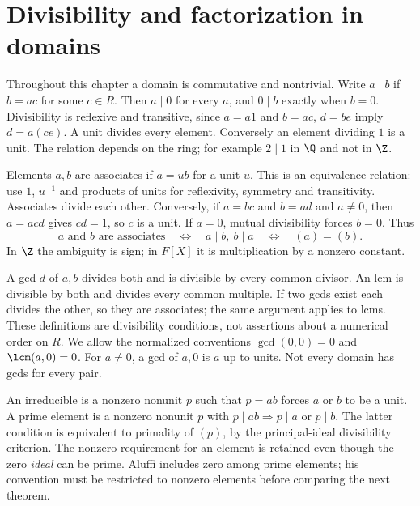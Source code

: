 \chapter{Divisibility and factorization in domains}\label{chap:M07.10}

Throughout this chapter a domain is commutative and nontrivial.
Write $a\mid b$ if $b=ac$ for some $c\in R$. Then $a\mid0$ for every
$a$, and $0\mid b$ exactly when $b=0$. Divisibility is reflexive and
transitive, since $a=a1$ and $b=ac$, $d=be$ imply $d=a(ce)$.
A unit divides every element. Conversely an element dividing $1$ is a
unit. The relation depends on the ring; for example $2\mid1$ in $\Q$
and not in $\Z$.

Elements $a,b$ are associates if $a=ub$ for a unit $u$.
This is an equivalence relation: use $1$, $u^{-1}$ and products of units
for reflexivity, symmetry and transitivity. Associates divide each other.
Conversely, if $a=bc$ and $b=ad$ and $a\ne0$, then
$a=acd$ gives $cd=1$, so $c$ is a unit. If $a=0$, mutual divisibility
forces $b=0$. Thus
\[
 a\text{ and }b\text{ are associates}
 \quad\Longleftrightarrow\quad a\mid b,\ b\mid a
 \quad\Longleftrightarrow\quad (a)=(b).
\]
In $\Z$ the ambiguity is sign; in $F[X]$ it is multiplication by a
nonzero constant.

A gcd $d$ of $a,b$ divides both and is divisible by every common
divisor. An lcm is divisible by both and divides every common multiple.
If two gcds exist each divides the other, so they are associates;
the same argument applies to lcms. These definitions are divisibility
conditions, not assertions about a numerical order on $R$.
We allow the normalized conventions $\gcd(0,0)=0$ and
$\lcm(a,0)=0$. For $a\ne0$, a gcd of $a,0$ is $a$ up to units.
Not every domain has gcds for every pair.

An irreducible is a nonzero nonunit $p$ such that $p=ab$ forces $a$ or
$b$ to be a unit. A prime element is a nonzero nonunit $p$ with
$p\mid ab\Rightarrow p\mid a$ or $p\mid b$.
The latter condition is equivalent to primality of $(p)$, by the
principal-ideal divisibility criterion. The nonzero requirement for an
element is retained even though the zero \emph{ideal} can be prime.
Aluffi includes zero among prime elements; his convention must be
restricted to nonzero elements before comparing the next theorem.

